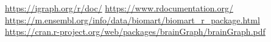 \url{https://igraph.org/r/doc/}
\url{https://www.rdocumentation.org/}
\url{https://m.ensembl.org/info/data/biomart/biomart_r_package.html}
\url{https://cran.r-project.org/web/packages/brainGraph/brainGraph.pdf}
